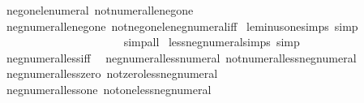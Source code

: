 \begin{isabellebody}
\ \ neg{\isacharunderscore}{\kern0pt}one{\isacharunderscore}{\kern0pt}le{\isacharunderscore}{\kern0pt}numeral\ not{\isacharunderscore}{\kern0pt}numeral{\isacharunderscore}{\kern0pt}le{\isacharunderscore}{\kern0pt}neg{\isacharunderscore}{\kern0pt}one\isanewline
\ \ neg{\isacharunderscore}{\kern0pt}numeral{\isacharunderscore}{\kern0pt}le{\isacharunderscore}{\kern0pt}neg{\isacharunderscore}{\kern0pt}one\ not{\isacharunderscore}{\kern0pt}neg{\isacharunderscore}{\kern0pt}one{\isacharunderscore}{\kern0pt}le{\isacharunderscore}{\kern0pt}neg{\isacharunderscore}{\kern0pt}numeral{\isacharunderscore}{\kern0pt}iff\isanewline
\isanewline
{}\isamarkupfalse%
\ le{\isacharunderscore}{\kern0pt}minus{\isacharunderscore}{\kern0pt}one{\isacharunderscore}{\kern0pt}simps\ {\isacharbrackleft}{\kern0pt}simp{\isacharbrackright}{\kern0pt}{\isacharcolon}{\kern0pt}\isanewline
\ \ {\isachardoublequoteopen}{\isacharminus}{\kern0pt}\ {}\ {\isasymle}\ {}{\isachardoublequoteclose}\isanewline
\ \ {\isachardoublequoteopen}{\isacharminus}{\kern0pt}\ {}\ {\isasymle}\ {}{\isachardoublequoteclose}\isanewline
\ \ {\isachardoublequoteopen}{\isasymnot}\ {}\ {\isasymle}\ {\isacharminus}{\kern0pt}\ {}{\isachardoublequoteclose}\isanewline
\ \ {\isachardoublequoteopen}{\isasymnot}\ {}\ {\isasymle}\ {\isacharminus}{\kern0pt}\ {}{\isachardoublequoteclose}\isanewline
%
\isadelimproof
\ \ %
\endisadelimproof
%
\isatagproof
{}\isamarkupfalse%
\ simp{\isacharunderscore}{\kern0pt}all%
\endisatagproof
{\isafoldproof}%
%
\isadelimproof
\isanewline
%
\endisadelimproof
\isanewline
{}\isamarkupfalse%
\ less{\isacharunderscore}{\kern0pt}neg{\isacharunderscore}{\kern0pt}numeral{\isacharunderscore}{\kern0pt}simps\ {\isacharbrackleft}{\kern0pt}simp{\isacharbrackright}{\kern0pt}\ {\isacharequal}{\kern0pt}\isanewline
\ \ neg{\isacharunderscore}{\kern0pt}numeral{\isacharunderscore}{\kern0pt}less{\isacharunderscore}{\kern0pt}iff\isanewline
\ \ neg{\isacharunderscore}{\kern0pt}numeral{\isacharunderscore}{\kern0pt}less{\isacharunderscore}{\kern0pt}numeral\ not{\isacharunderscore}{\kern0pt}numeral{\isacharunderscore}{\kern0pt}less{\isacharunderscore}{\kern0pt}neg{\isacharunderscore}{\kern0pt}numeral\isanewline
\ \ neg{\isacharunderscore}{\kern0pt}numeral{\isacharunderscore}{\kern0pt}less{\isacharunderscore}{\kern0pt}zero\ not{\isacharunderscore}{\kern0pt}zero{\isacharunderscore}{\kern0pt}less{\isacharunderscore}{\kern0pt}neg{\isacharunderscore}{\kern0pt}numeral\isanewline
\ \ neg{\isacharunderscore}{\kern0pt}numeral{\isacharunderscore}{\kern0pt}less{\isacharunderscore}{\kern0pt}one\ not{\isacharunderscore}{\kern0pt}one{\isacharunderscore}{\kern0pt}less{\isacharunderscore}{\kern0pt}neg{\isacharunderscore}{\kern0pt}numeral\isanewline

\end{isabellebody}
